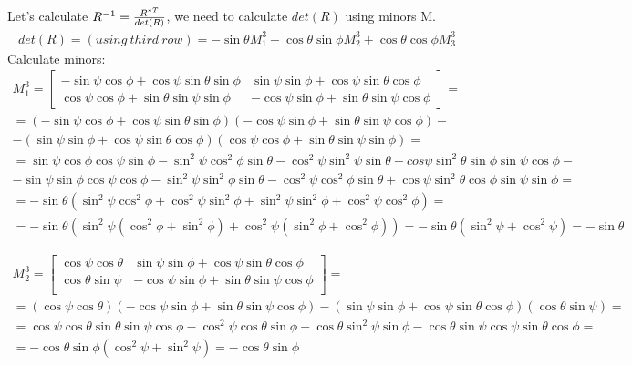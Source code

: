 \documentclass[a4paper, twoside, english]{article}
\begin{document}
{Let's calculate ${{R}^{-1}}={{R^{*T}}\over{det(R)}}$, we need to calculate $det(R)$ using minors M.
 \begin{equation}
 	\begin{gathered}
 		det(R) = (using \ third \ row)= -\sin\theta M^{3}_1 - \cos\theta\sin\phi M^{3}_2 + \cos\theta\cos\phi M^{3}_3
 	\end{gathered}
 \label{eq:kmatrixDET}
\end{equation}
Calculate minors:
 \begin{equation}
	\begin{gathered}
		M^{3}_1 = 
			\left[
		\begin{array}{cc}
		 -\sin\psi\cos\phi+\cos\psi\sin\theta\sin\phi & \sin\psi\sin\phi+\cos\psi\sin\theta\cos\phi\\
		 \cos\psi\cos\phi+\sin\theta\sin\psi\sin\phi  & -\cos\psi\sin\phi+\sin\theta\sin\psi\cos\phi		 	
		\end{array}
		\right]=\\
		=(-\sin\psi\cos\phi+\cos\psi\sin\theta\sin\phi)(-\cos\psi\sin\phi+\sin\theta\sin\psi\cos\phi)-\\-(\sin\psi\sin\phi+\cos\psi\sin\theta\cos\phi)(\cos\psi\cos\phi+\sin\theta\sin\psi\sin\phi)=\\= \sin\psi \cos\phi \cos\psi \sin\phi - \sin^2\psi \cos^2\phi \sin\theta - \cos^2\psi \sin^2 \psi \sin\theta +cos\psi\sin^2\theta \sin\phi\sin\psi\cos\phi-\\-\sin\psi\sin\phi\cos\psi\cos\phi-\sin^2\psi\sin^2\phi\sin\theta-\cos^2\psi\cos^2\phi\sin\theta+\cos\psi\sin^2\theta\cos\phi\sin\psi\sin\phi=\\=-\sin\theta(\sin^2\psi\cos^2\phi+\cos^2\psi\sin^2\phi+\sin^2\psi\sin^2\phi+\cos^2\psi\cos^2\phi)=\\=-\sin\theta(\sin^2\psi(\cos^2\phi+\sin^2\phi)+\cos^2\psi(\sin^2\phi+\cos^2\phi))=-\sin\theta(\sin^2\psi+\cos^2\psi)=-\sin\theta
	\end{gathered}
\label{eq:kmatrixM31}
\end{equation}

\begin{equation}
	\begin{gathered}
		M^{3}_2 = 
		\left[
		\begin{array}{cc}
		\cos\psi\cos\theta & \sin\psi\sin\phi+\cos\psi\sin\theta\cos\phi\\
		\cos\theta\sin\psi   & -\cos\psi\sin\phi+\sin\theta\sin\psi\cos\phi\\	 	
		\end{array}
		\right]=\\
		= (\cos\psi\cos\theta)(-\cos\psi\sin\phi+\sin\theta\sin\psi\cos\phi)-(\sin\psi\sin\phi+\cos\psi\sin\theta\cos\phi)(\cos\theta\sin\psi)=\\=
		\cos\psi\cos\theta\sin\theta\sin\psi\cos\phi - \cos^2\psi\cos\theta\sin\phi - \cos\theta\sin^2\psi\sin\phi-\cos\theta\sin\psi\cos\psi\sin\theta\cos\phi=\\=
		-\cos\theta\sin\phi(\cos^2\psi+\sin^2\psi)=-\cos\theta\sin\phi
	\end{gathered}
\label{eq:kmatrixM32}
\end{equation}

}
\end{document}
